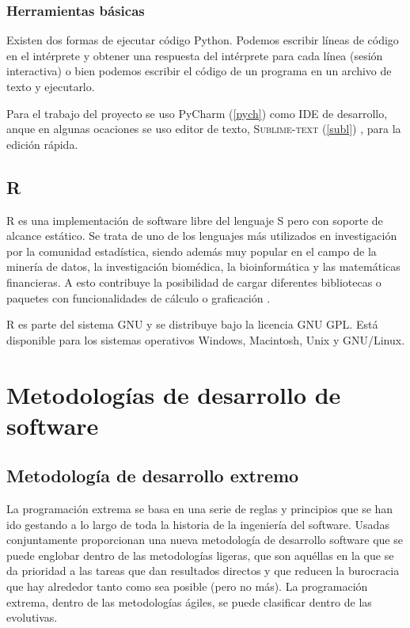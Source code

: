 \documentclass[12pt]{book} %
\begin{document}
			\subsubsection{Herramientas básicas}
				Existen dos formas de ejecutar código Python. Podemos escribir líneas de código en el intérprete y obtener una respuesta del
				intérprete para cada línea (sesión interactiva) o bien podemos escribir el código de un programa en un archivo de texto y
				ejecutarlo.
				
				Para el trabajo del proyecto se uso PyCharm (\ref{pych}) como IDE de desarrollo, anque en algunas ocaciones se uso editor de
				texto, \textsc{Sublime-text} (\ref{subl}) , para la edición rápida.

	\subsection{R \label{r}}
		R es una implementación de software libre del lenguaje S pero con soporte de alcance estático. Se trata de uno de los
		lenguajes más utilizados en investigación por la comunidad estadística, siendo además muy popular en el campo de la minería de
		datos, la investigación biomédica, la bioinformática y las matemáticas financieras. A esto contribuye la posibilidad de cargar
		diferentes bibliotecas o paquetes con funcionalidades de cálculo o graficación \cite{rdev} .
		
		R es parte del sistema GNU y se distribuye bajo la licencia GNU GPL. Está disponible para los sistemas operativos Windows,
		Macintosh, Unix y GNU/Linux.
		
		
	
		
\newpage
\section{Metodologías de desarrollo de software}
	
	\subsection{Metodología de desarrollo extremo \label{XP}}
		La programación extrema se basa en una serie de reglas y principios que se han ido gestando a lo largo de toda la historia de la 
		ingeniería del software. Usadas conjuntamente proporcionan una nueva metodología de desarrollo software que se puede englobar dentro
		de las metodologías ligeras, que son aquéllas en la que se da 	prioridad a las tareas que dan resultados directos y que reducen la
		burocracia que hay alrededor tanto como sea posible (pero no más).
		La programación extrema, dentro de las metodologías ágiles, se puede clasificar dentro de las evolutivas.
		
\end{document}
